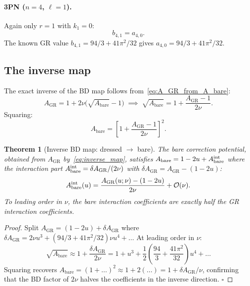 \documentclass[11pt,a4paper]{article}
\theoremstyle{plain}
\newtheorem{theorem}{Theorem}[section]
\theoremstyle{definition}
\theoremstyle{remark}
\newcommand{\GR}{\mathrm{GR}}
\newcommand{\bare}{\mathrm{bare}}
\begin{document}
\paragraph{3PN ($n=4$, $\ell=1$).} Again only $r=1$ with $k_1=0$:
\begin{equation}
  b_{4,1} = a_{4,0}.
  \label{eq:b41}
\end{equation}
The known GR value $b_{4,1} = 94/3 + 41\pi^2/32$ gives $a_{4,0} = 94/3 + 41\pi^2/32$.

\subsection{The inverse map}

The exact inverse of the BD map follows from~\eqref{eq:A_GR_from_A_bare}:
\begin{equation}
  A_\GR = 1 + 2\nu\bigl(\sqrt{A_\bare} - 1\bigr)
  \;\implies\;
  \sqrt{A_\bare} = 1 + \frac{A_\GR - 1}{2\nu}.
  \label{eq:inverse_exact}
\end{equation}
Squaring:
\begin{equation}
  \boxed{
  A_\bare = \left[1 + \frac{A_\GR - 1}{2\nu}\right]^2.
  }
  \label{eq:inverse_map}
\end{equation}

\begin{theorem}[Inverse BD map: dressed $\to$ bare]
\label{thm:inverse}
The bare correction potential, obtained from $A_\GR$ by~\eqref{eq:inverse_map},
satisfies $A_\bare = 1 - 2u + A_\bare^{\rm int}$ where the interaction part
$A_\bare^{\rm int} = \delta A_\GR/(2\nu)$ with $\delta A_\GR = A_\GR - (1-2u)$:
\begin{equation}
  A_\bare^{\rm int}(u)
  = \frac{A_\GR(u;\nu) - (1-2u)}{2\nu}
  + \mathcal{O}(\nu).
  \label{eq:A_bare_int}
\end{equation}
To leading order in $\nu$, the bare interaction coefficients are \emph{exactly half
the GR interaction coefficients}.
\end{theorem}

\begin{proof}
Split $A_\GR = (1-2u) + \delta A_\GR$ where $\delta A_\GR = 2\nu u^3 +
(94/3+41\pi^2/32)\nu u^4 + \ldots$ At leading order in $\nu$:
\begin{equation}
  \sqrt{A_\bare} \approx 1 + \frac{\delta A_\GR}{2\nu}
  = 1 + u^3 + \frac{1}{2}\!\left(\frac{94}{3}+\frac{41\pi^2}{32}\right)u^4 + \ldots
\end{equation}
Squaring recovers $A_\bare = (1+\ldots)^2 \approx 1 + 2(\ldots) = 1 + \delta A_\GR/\nu$,
confirming that the BD factor of $2\nu$ halves the coefficients in the inverse direction.
\qquad $\square$
\end{proof}
\end{document}
